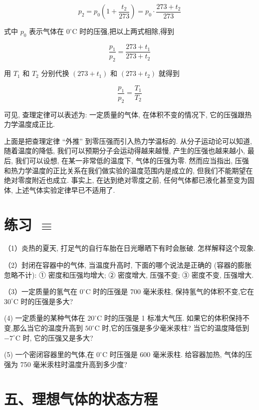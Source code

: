 \documentclass[10pt]{article}
\begin{document}
\[
{p}_{2} = {p}_{0}\left( {1 + \frac{{t}_{2}}{273}}\right) = {p}_{0} \cdot \frac{{273} + {t}_{2}}{273}
\]

式中 \({p}_{0}\) 表示气体在 \({0}^{ \circ }\mathrm{C}\) 时的压强,把以上两式相除,得到

\[
\frac{{p}_{1}}{{p}_{2}} = \frac{{273} + {t}_{1}}{{273} + {t}_{2}}
\]

用 \({T}_{1}\) 和 \({T}_{2}\) 分别代换 \(\left( {{273} + {t}_{1}}\right)\) 和 \(\left( {{273} + {t}_{2}}\right)\) 就得到

\[
\frac{{p}_{1}}{{p}_{2}} = \frac{{T}_{1}}{{T}_{2}}
\]

可见, 查理定律可以表述为: 一定质量的气体, 在体积不变的情况下, 它的压强跟热力学温度成正比.

上面是把查理定律 “外推” 到零压强而引入热力学温标的. 从分子运动论可以知道, 随着温度的降低, 我们可以预期分子会运动得越来越慢, 产生的压强也越来越小, 最后, 我们可以设想, 在某一非常低的温度下, 气体的压强为零. 然而应当指出, 压强和热力学温度的正比关系在我们做实验的温度范围内是成立的, 但我们不能期望在绝对零度附近也成立. 事实上, 在达到绝对零度之前, 任何气体都已液化甚至变为固体, 上述气体实验定律早已不适用了.

\section*{练习 \(\equiv\)}

（1）炎热的夏天, 打足气的自行车胎在日光曝晒下有时会胀破. 怎样解释这个现象.

（2）封闭在容器中的气体, 当温度升高时, 下面的哪个说法是正确的 (容器的膨胀忽略不计): ① 密度和压强均增大; ② 密度增大, 压强不变; ③ 密度不变, 压强增大.

（3）一定质量的氢气在 \({0}^{ \circ }\mathrm{C}\) 时的压强是 700 毫米汞柱, 保持氢气的体积不变,它在 \({30}^{ \circ }\mathrm{C}\) 时的压强是多大?

(4) 一定质量的某种气体在 \({20}^{ \circ }\mathrm{C}\) 时的压强是 1 标准大气压. 如果它的体积保持不变,那么当它的温度升高到 \({50}^{ \circ }\mathrm{C}\) 时,它的压强是多少毫米汞柱? 当它的温度降低到 \(- {7}^{ \circ }\mathrm{C}\) 时, 它的压强又是多大?

(5) 一个密闭容器里的气体,在 \({0}^{ \circ }\mathrm{C}\) 时压强是 600 毫米汞柱. 给容器加热, 气体的压强为 750 毫米汞柱时温度升高到多少度?

\section*{五、理想气体的状态方程}
\end{document}
